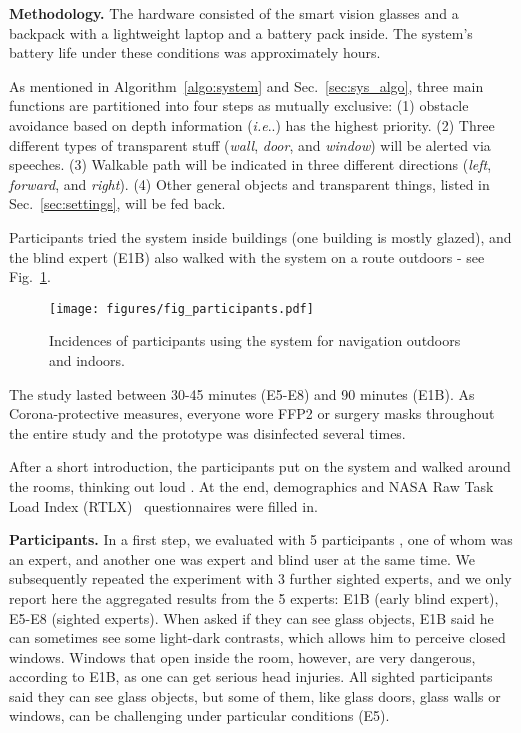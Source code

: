\documentclass[journal]{IEEEtran}
\makeatletter
\DeclareRobustCommand\onedot{\futurelet\@let@token\@onedot}
\def\@onedot{\ifx\@let@token.\else.\null\fi\xspace}
\def\ie{\emph{i.e}\onedot} \def\Ie{\emph{I.e}\onedot}
\makeatother
\begin{document}
\noindent\textbf{Methodology.}
The hardware consisted of the smart vision glasses and
a backpack with a lightweight laptop and a battery pack inside. The system's battery life under these conditions was approximately  hours.

As mentioned in Algorithm~\ref{algo:system} and Sec.~\ref{sec:sys_algo},
three main functions are partitioned into four steps as mutually exclusive: (1) obstacle avoidance based on depth information (\ie ) has the highest priority. (2) Three different types of transparent stuff (\emph{wall}, \emph{door}, and \emph{window}) will be alerted via speeches. (3) Walkable path will be indicated in three different directions (\emph{left}, \emph{forward}, and \emph{right}). (4) Other general objects and transparent things, listed in Sec.~\ref{sec:settings}, will be fed back.

Participants tried the system inside  buildings (one building is mostly glazed), and the blind expert (E1B) also walked with the system on a  route outdoors - see Fig.~\ref{fig:participants}.
\begin{figure}[b]
    \centering
    \texttt{[image: figures/fig\_participants.pdf]}
\caption{\small Incidences of participants using the system for navigation outdoors and indoors.}
    \label{fig:participants}
\end{figure}
The study lasted between 30-45 minutes (E5-E8) and 90 minutes (E1B).
As Corona-protective measures, everyone wore FFP2 or surgery masks throughout the entire
study 
and the prototype was disinfected several times.

After a short introduction, the participants put on the system and walked around the rooms, thinking out loud \cite{johnstone2006using}.
At the end, demographics and NASA Raw Task Load Index (RTLX)~\cite{hart2006nasa} questionnaires were filled in.

\noindent\textbf{Participants.} 
In a first step, we evaluated with 5 participants \cite{zhang2021trans4trans}, one of whom was an expert, and another one was expert and blind user at the same time. We subsequently repeated the experiment with 3 further sighted experts, and we only report here the aggregated results from the 5 experts: E1B (early blind expert), E5-E8 (sighted experts).
When asked if they can see glass objects,
E1B said he can sometimes see some light-dark contrasts, which allows him to perceive
closed windows.
Windows that open inside the room, however, are very dangerous, according to E1B, as one can get serious head injuries. All sighted participants said they can see glass objects, but some of them, like glass doors, glass walls or windows, can be challenging under particular conditions (E5).
\end{document}
